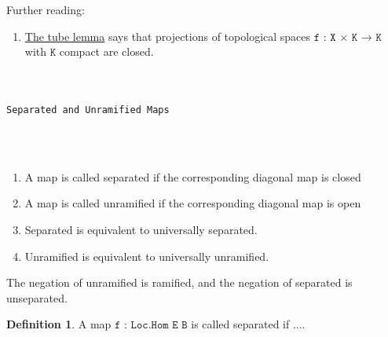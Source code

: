\documentclass{book}
\theoremstyle{definition}
\newtheorem{definition}{Definition}
\newtheorem{theorem}{Theorem}
\newcounter{lcounter}
\renewcommand{\chapter}[1]{
\newpage
{
\Huge 
\begin{center}
\ \\
\ \\
\thispagestyle{empty}
\texttt{#1}
\end{center}}
\ \\
\ \\
}
\begin{document}

Further reading:
\begin{enumerate}
\item \href{https://en.wikipedia.org/wiki/Tube_lemma}{The tube lemma} says that projections of topological spaces $\texttt{f : X × K → K}$ with $\texttt{K}$ compact are closed.
\end{enumerate}

\chapter{Separated and Unramified Maps}

\begin{enumerate}
\item A map is called separated if the corresponding diagonal map is closed
\item A map is called unramified if the corresponding diagonal map is open
\item Separated is equivalent to universally separated.
\item Unramified is equivalent to universally unramified. 
\end{enumerate}

The negation of unramified is ramified, and the negation of separated is unseparated.

\begin{definition}
A map $\texttt{f : Loc.Hom E B}$ is called separated if ....
\end{definition}

\begin{center}
\begin{tcolorbox}[width=5in,colback={white},title={\begin{center}\texttt{Lean \thelcounter} \addtocounter{lcounter}{1}  \end{center}},colbacktitle=Blue,coltitle=black]
\begin{verbatim}

\end{verbatim}
\end{tcolorbox}
\end{center}
\end{document}
